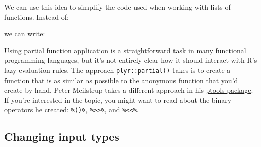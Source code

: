We can use this idea to simplify the code used when working with lists
of functions. Instead of:

\begin{Shaded}
\begin{Highlighting}[]
\StringTok{ }\NormalTok{(}
    \NormalTok{),}
    \NormalTok{),}
    \NormalTok{)}
\NormalTok{)}
\end{Highlighting}
\end{Shaded}

we can write:

\begin{Shaded}
\begin{Highlighting}[]
\StringTok{ }\NormalTok{(}
    \NormalTok{),}
    \NormalTok{),}
    \NormalTok{)}
\NormalTok{)}
\end{Highlighting}
\end{Shaded}

Using partial function application is a straightforward task in many
functional programming languages, but it's not entirely clear how it
should interact with R's lazy evaluation rules. The approach
\texttt{plyr::partial()} takes is to create a function that is as
similar as possible to the anonymous function that you'd create by hand.
Peter Meilstrup takes a different approach in his
\href{https://github.com/crowding/ptools/}{ptools package}. If you're
interested in the topic, you might want to read about the binary
operators he created: \texttt{\%()\%},
\texttt{\%\textgreater{}\textgreater{}\%}, and
\texttt{\%\textless{}\textless{}\%}.

\subsection{Changing input types}


